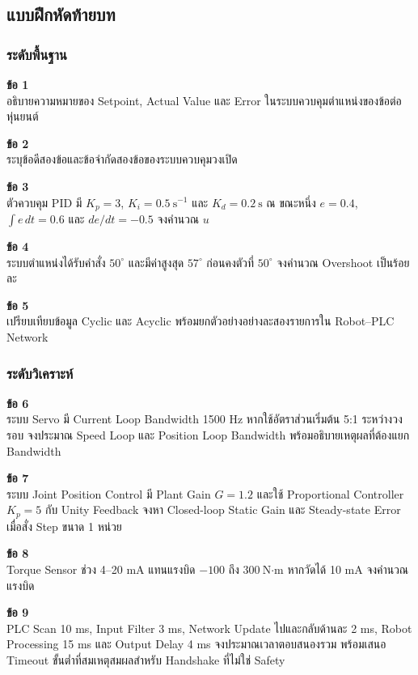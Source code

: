 \newpage

\subsection{แบบฝึกหัดท้ายบท}

\subsubsection{ระดับพื้นฐาน}

\textbf{ข้อ 1} \\
อธิบายความหมายของ Setpoint, Actual Value และ Error ในระบบควบคุมตำแหน่งของข้อต่อหุ่นยนต์

\textbf{ข้อ 2} \\
ระบุข้อดีสองข้อและข้อจำกัดสองข้อของระบบควบคุมวงเปิด

\textbf{ข้อ 3} \\
ตัวควบคุม PID มี $K_p=3$, $K_i=0.5\ \text{s}^{-1}$ และ $K_d=0.2\ \text{s}$ ณ ขณะหนึ่ง $e=0.4$, $\int e\,dt=0.6$ และ $de/dt=-0.5$ จงคำนวณ $u$

\textbf{ข้อ 4} \\
ระบบตำแหน่งได้รับคำสั่ง $50^\circ$ และมีค่าสูงสุด $57^\circ$ ก่อนคงตัวที่ $50^\circ$ จงคำนวณ Overshoot เป็นร้อยละ

\textbf{ข้อ 5} \\
เปรียบเทียบข้อมูล Cyclic และ Acyclic พร้อมยกตัวอย่างอย่างละสองรายการใน Robot–PLC Network

\subsubsection{ระดับวิเคราะห์}

\textbf{ข้อ 6} \\
ระบบ Servo มี Current Loop Bandwidth 1500 Hz หากใช้อัตราส่วนเริ่มต้น 5:1 ระหว่างวงรอบ จงประมาณ Speed Loop และ Position Loop Bandwidth พร้อมอธิบายเหตุผลที่ต้องแยก Bandwidth

\textbf{ข้อ 7} \\
ระบบ Joint Position Control มี Plant Gain $G=1.2$ และใช้ Proportional Controller $K_p=5$ กับ Unity Feedback จงหา Closed-loop Static Gain และ Steady-state Error เมื่อสั่ง Step ขนาด 1 หน่วย

\textbf{ข้อ 8} \\
Torque Sensor ช่วง 4–20 mA แทนแรงบิด $-100$ ถึง $300\ \text{N·m}$ หากวัดได้ 10 mA จงคำนวณแรงบิด

\textbf{ข้อ 9} \\
PLC Scan 10 ms, Input Filter 3 ms, Network Update ไปและกลับด้านละ 2 ms, Robot Processing 15 ms และ Output Delay 4 ms จงประมาณเวลาตอบสนองรวม พร้อมเสนอ Timeout ขั้นต่ำที่สมเหตุสมผลสำหรับ Handshake ที่ไม่ใช่ Safety

